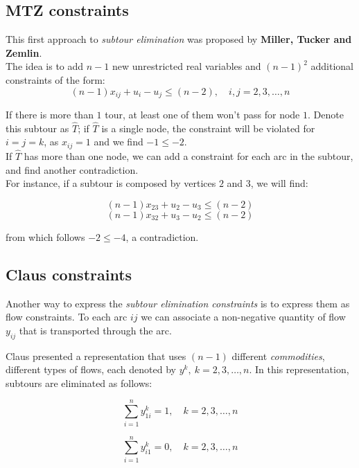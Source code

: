 \documentclass[
12pt,
a4paper,
oneside,
headinclude,
footinclude]{article}
\begin{document}
    \subsection{MTZ constraints}
    This first approach to \textit{subtour elimination} was proposed by \textbf{Miller, Tucker and Zemlin}.\\
    The idea is to add  $n-1$ new unrestricted real variables and $(n-1)^2$ additional constraints of the form:
    \begin{equation}
    {
    (n-1)x_{ij} + u_i - u_j \leq (n-2),\quad i,j = 2,3,\ldots,n
    }
    \end{equation}
    
    If there is more than $1$ tour, at least one of them won't pass for node $1$. Denote this subtour as $\hat{T}$; if $\hat{T}$ is a single node, the constraint will be violated for $i = j = k$, as $x_{ij}=1$ and we find $-1 \leq -2$. \\
    If $\hat{T}$ has more than one node, we can add a constraint for each arc in the subtour, and find another contradiction. \\
    For instance, if a subtour is composed by vertices $2$ and $3$, we will find:
    
    $$(n-1)x_{23} + u_2 - u_3 \leq (n-2)$$ 
    $$(n-1)x_{32} + u_3 - u_2 \leq (n-2)$$ 
    
    from which follows $-2 \leq -4$, a contradiction.
    
    \subsection{Claus constraints}
    Another way to express the \textit{subtour elimination constraints} is to express them as flow constraints. To each arc ${ij}$ we can associate a non-negative quantity of flow $y_{ij}$ that is transported through the arc. 
    
    Claus presented a representation that uses $(n-1)$ different \textit{commodities}, different types of flows, each denoted by $y^k,\ k=2,3,\ldots,n$.
    In this representation, subtours are eliminated as follows:
    
    \begin{equation}
    {
    \sum_{i=1}^n{y_{1i}^k=1},\quad k=2,3,\ldots,n
    }
    \end{equation}
    
    \begin{equation}
    {
    \sum_{i=1}^n{y_{i1}^k}=0,\quad k=2,3,\ldots,n
    }
    \end{equation}  
      
\end{document}
